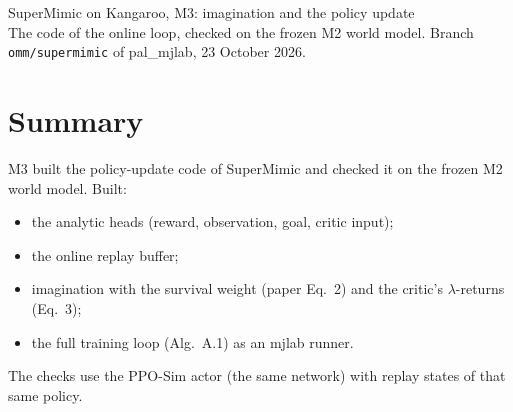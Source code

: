 \documentclass[10pt]{article}
\begin{document}
\sloppy

\begin{center}
{\LARGE SuperMimic on Kangaroo, M3: imagination and the policy update}\\[4pt]
The code of the online loop, checked on the frozen M2 world model. Branch \texttt{omm/supermimic} of
pal\_mjlab, 23 October 2026.
\end{center}

\section*{Summary}

M3 built the policy-update code of SuperMimic and checked it on the frozen M2 world model. Built:
\begin{itemize}
  \item the analytic heads (reward, observation, goal, critic input);
  \item the online replay buffer;
  \item imagination with the survival weight (paper Eq.~2) and the critic's $\lambda$-returns (Eq.~3);
  \item the full training loop (Alg.~A.1) as an mjlab runner.
\end{itemize}
The checks use the PPO-Sim actor (the same network) with replay states of that same policy.
\end{document}
